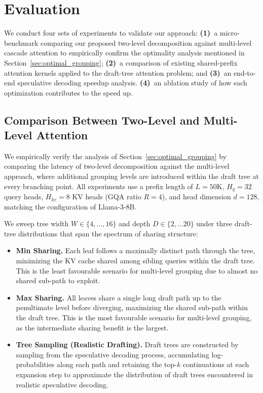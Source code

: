 \documentclass{article}
\begin{document}
\section{Evaluation}
\label{sec:evaluation}

We conduct four sets of experiments to validate our approach:
\textbf{(1)}~a micro-benchmark comparing our proposed two-level decomposition against
multi-level cascade attention to empirically confirm the optimality analysis mentioned in Section~\ref{sec:optimal_grouping};
\textbf{(2)}~a comparison of existing shared-prefix attention kernels applied
to the draft-tree attention problem; and
\textbf{(3)}~an end-to-end speculative decoding speedup analysis. \textbf{(4)}~an ablation study of how each optimization contributes to the speed up.

\subsection{Comparison Between Two-Level and Multi-Level Attention}
\label{subsec:exp_twolevel}

We empirically verify the analysis of Section~\ref{sec:optimal_grouping} by
comparing the latency of two-level decomposition against the multi-level approach,
where additional grouping levels are introduced within the draft tree at every
branching point. All experiments use a prefix length of $L = 50$K,
$H_q = 32$ query heads, $H_{kv} = 8$ KV heads (GQA ratio $R = 4$), and head
dimension $d = 128$, matching the configuration of Llama-3-8B.

We sweep tree width $W \in \{4, \ldots, 16\}$ and depth
$D \in \{2, \ldots 20\}$ under three draft-tree distributions
that span the spectrum of sharing structure:
\begin{itemize}
  \item \textbf{Min Sharing.} Each leaf follows a maximally distinct path
    through the tree, minimizing the KV cache shared among sibling queries
    within the draft tree. This is the least favourable scenario for
    multi-level grouping due to almost no shared sub-path to exploit.

  \item \textbf{Max Sharing.} All leaves share a single long draft path up to
    the penultimate level before diverging, maximizing the shared sub-path
    within the draft tree. This is the most favourable scenario for
    multi-level grouping, as the intermediate sharing benefit is
    the largest.

    \item \textbf{Tree Sampling (Realistic Drafting).} Draft trees are constructed by sampling from the speculative decoding process, accumulating log-probabilities along each path and retaining the top-$k$ continuations at each expansion step to approximate the distribution of draft trees encountered in realistic speculative decoding.
\end{itemize}
\end{document}
